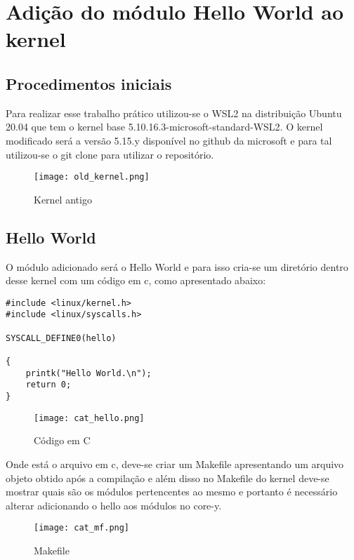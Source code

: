 \documentclass[a4paper, 12pt]{article}
\begin{document}
\newpage
{}
\section{Adição do módulo Hello World ao kernel}

\subsection{Procedimentos iniciais}
Para realizar esse trabalho prático utilizou-se o WSL2 na distribuição Ubuntu 20.04 que tem o kernel base 5.10.16.3-microsoft-standard-WSL2. O kernel modificado será a versão 5.15.y disponível no github da microsoft e para tal utilizou-se o git clone para utilizar o repositório. 

\begin{figure}[h]
\centering 
\texttt{[image: old\_kernel.png]}
\label{figura:qualquernome}
\caption{Kernel antigo}
\end{figure}

\subsection{Hello World}
O módulo adicionado será o Hello World e para isso cria-se um diretório dentro desse kernel com um código em c, como apresentado abaixo:

\begin{lstlisting} 
#include <linux/kernel.h>
#include <linux/syscalls.h>

SYSCALL_DEFINE0(hello)

{
    printk("Hello World.\n");
    return 0;
} 
\end{lstlisting}

\begin{figure}[h]
\centering 
\texttt{[image: cat\_hello.png]}
\label{figura:qualquernome}
\caption{Código em C}
\end{figure}

Onde está o arquivo em c, deve-se criar um Makefile apresentando um arquivo objeto obtido após a compilação e além disso no Makefile do kernel deve-se mostrar quais são os módulos pertencentes ao mesmo e portanto é necessário alterar adicionando o hello aos módulos no core-y.

\begin{figure}[!htb]
\centering 
\texttt{[image: cat\_mf.png]}
\label{figura:qualquernome}
\caption{Makefile}
\end{figure}
\end{document}
